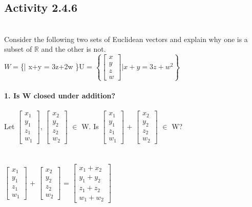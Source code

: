 \documentclass{article}
\begin{document}
{\subsection*{Activity 2.4.6}\\
Consider the following two sets of Euclidean vectors and explain why one is a subset of $\mathbb{R}$ and the other is not.\\
$W = $\left\{\left[\begin{matrix}x\\y\\z\\w\end{matrix}\right] \Bigg| x+y = 3z+2w \right\}$ 
$U = $\left\{\left[\begin{matrix}x\\y\\z\\w\end{matrix}\right] \Bigg| x+y = 3z+w^{2} \right\}$\\
\\
\textbf{1. Is W closed under addition?}\\
\\
Let $\left[\begin{matrix}x_{1}\\y_{1}\\z{_1}\\w_{1}\end{matrix}\right]$, $\left[\begin{matrix}x_{2}\\y_{2}\\z{_2}\\w_{2}\end{matrix}\right]$ $\in$ W.  Is $\left[\begin{matrix}x_{1}\\y_{1}\\z{_1}\\w_{1}\end{matrix}\right]$ + $\left[\begin{matrix}x_{2}\\y_{2}\\z{_2}\\w_{2}\end{matrix}\right]$ $\in$ W? \\
\\
\\
$\left[\begin{matrix}x_{1}\\y_{1}\\z{_1}\\w_{1}\end{matrix}\right]$ + $\left[\begin{matrix}x_{2}\\y_{2}\\z{_2}\\w_{2}\end{matrix}\right]$ = $\left[\begin{matrix}x_{1} + x_{2}\\y_{1} + y_{2}\\z_{1} + z{_2}\\w_{1} + w_{2}\end{matrix}\right]$\\
}
\end{document}
